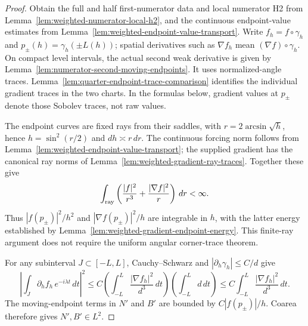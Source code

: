 \begin{proof}
\leanok
Obtain the full and half first-numerator data and local numerator H2 from
Lemma~\ref{lem:weighted-numerator-local-h2}, and the continuous endpoint-value
estimates from Lemma~\ref{lem:weighted-endpoint-value-transport}.
Write $f_h=f\circ\gamma_h$ and $p_\pm(h)=\gamma_h(\pm L(h))$;
spatial derivatives such as $\nabla f_h$ mean $(\nabla f)\circ\gamma_h$.
On compact level intervals, the actual second weak derivative is given by
Lemma~\ref{lem:numerator-second-moving-endpoints}.
It uses normalized-angle traces. Lemma~\ref{lem:quarter-endpoint-trace-comparison}
identifies the individual gradient traces in the two charts. In the formulas
below, gradient values at $p_\pm$ denote those Sobolev traces, not raw values.

The endpoint curves are fixed rays from their saddles, with
$r=2\arcsin\sqrt h$, hence $h=\sin^2(r/2)$ and $dh\asymp r\,dr$.
The continuous forcing norm follows from
Lemma~\ref{lem:weighted-endpoint-value-transport}; the supplied gradient
has the canonical ray norms of Lemma~\ref{lem:weighted-gradient-ray-traces}.
Together these give
\[
 \int_{\rm ray}\left(\frac{|f|^2}{r^3}
                    +\frac{|\nabla f|^2}{r}\right)\,dr<\infty .
\]
Thus $|f(p_\pm)|^2/h^2$ and $|\nabla f(p_\pm)|^2/h$ are integrable in $h$,
with the latter energy established by
Lemma~\ref{lem:weighted-gradient-endpoint-energy}. This finite-ray argument
does not require the uniform angular corner-trace theorem.

For any subinterval $J\subset[-L,L]$, Cauchy--Schwarz and
$|\partial_h\gamma_h|\le C/d$ give
\[
 \left|\int_J\partial_hf_h\,e^{-i\lambda t}\,dt\right|^2
 \le C\left(\int_{-L}^L\frac{|\nabla f_h|^2}{d^3}\,dt\right)
        \left(\int_{-L}^Ld\,dt\right)
 \le C\int_{-L}^L\frac{|\nabla f_h|^2}{d^3}\,dt .
\]
The moving-endpoint terms in $N'$ and $B'$ are bounded by
$C|f(p_\pm)|/h$. Coarea therefore gives $N',B'\in L^2$.


\end{proof}
